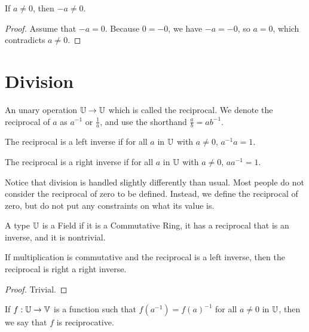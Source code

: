 \documentclass[../../math.tex]{subfiles}
\begin{document}
\begin{theorem}
    If $a \neq 0$, then $-a \neq 0$.
\end{theorem}
\begin{proof}
    Assume that $-a = 0$.  Because $0 = -0$, we have $-a = -0$, so $a = 0$,
    which contradicts $a \neq 0$.
\end{proof}

\section{Division}

\begin{class}
    An unary operation $\mathbb{U} \rightarrow \mathbb{U}$ which is called the reciprocal.  We
    denote the reciprocal of $a$ as $a^{-1}$ or $\frac{1}{a}$, and use the
    shorthand $\frac{a}{b} = a b^{-1}$.
\end{class}

\begin{class}
    The reciprocal is a left inverse if for all $a$ in $\mathbb{U}$ with $a \neq 0$,
    $a^{-1}a = 1$.
\end{class}

\begin{class}
    The reciprocal is a right inverse if for all $a$ in $\mathbb{U}$ with $a \neq 0$,
    $aa^{-1} = 1$.
\end{class}

Notice that division is handled slightly differently than usual.  Most people do
not consider the reciprocal of zero to be defined.  Instead, we define the
reciprocal of zero, but do not put any constraints on what its value is.

\begin{class}[Field]
    A type $\mathbb{U}$ is a Field if it is a Commutative Ring, it has a reciprocal that
    is an inverse, and it is nontrivial.
\end{class}

\begin{instance}
    If multiplication is commutative and the reciprocal is a left inverse, then
    the reciprocal is right a right inverse.
\end{instance}
\begin{proof}
    Trivial.
\end{proof}

\begin{class}
    If $f : \mathbb{U} \to \mathbb{V}$ is a function such that $f(a^{-1}) = f(a)^{-1}$ for all
    $a \neq 0$ in $\mathbb{U}$, then we say that $f$ is reciprocative.
\end{class}
\end{document}
